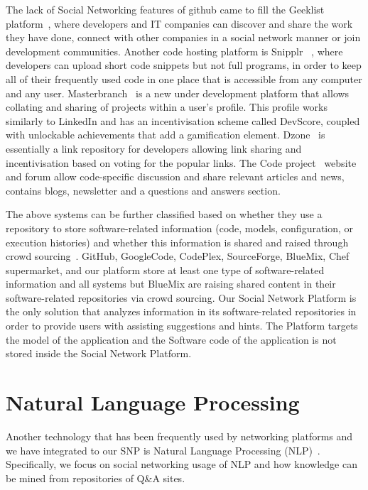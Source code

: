 The lack of Social Networking features of github came to fill the Geeklist platform~\cite{geeklist_url}, where developers and IT companies can discover and share the work they have done, connect with other companies in a social network manner or join development communities. Another code hosting platform is Snipplr ~\cite{snipplr_url}, where developers can upload short code snippets but not full programs, in order to keep all of their frequently used code in one place that is accessible from any computer and any user. Masterbranch~\cite{masterbranch_url} is a new under development platform that allows collating and sharing of projects within a user's profile. This profile works similarly to LinkedIn and has an incentivisation scheme called DevScore, coupled with unlockable achievements that add a gamification element. Dzone~\cite{dzone_url} is essentially a link repository for developers allowing link sharing and incentivisation based on voting for the popular links. The Code project~\cite{codeproject_url} website and forum allow code-specific discussion and share relevant articles and news, contains blogs, newsletter and a questions and answers section.

The above systems can be further classified based on whether they use a repository to store software-related information (code, models, configuration, or execution histories) and whether this information is shared and raised through crowd sourcing~\cite{	howe2006rise}.  GitHub, GoogleCode, CodePlex, SourceForge, BlueMix, Chef supermarket, and our platform store at least one type of software-related information and all systems but BlueMix are raising shared content in their software-related repositories via crowd sourcing. Our Social Network Platform is the only solution that analyzes information in its software-related repositories in order to provide users with assisting suggestions and hints. The Platform targets the model of the application and the Software code of the application is not stored inside the Social Network Platform. 

\section{Natural Language Processing}
Another technology that has been frequently used by networking platforms and we have integrated to our SNP is Natural Language Processing (NLP)~\cite{manning1999foundations}. Specifically, we focus on social networking usage of NLP and how knowledge can be mined from repositories of Q\&A sites. 

